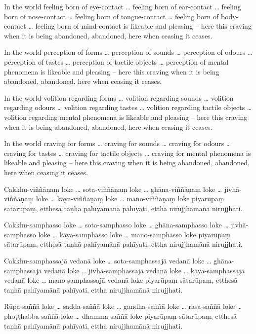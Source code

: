 In the world feeling born of eye-contact \ldots{} feeling born of ear-contact
\ldots{} feeling born of nose-contact \ldots{} feeling born of tongue-contact
\ldots{} feeling born of body-contact \ldots{} feeling born of mind-contact is
likeable and pleasing -- here this craving when it is being abandoned, abandoned,
here when ceasing it ceases.

In the world perception of forms \ldots{} perception of sounds \ldots{}
perception of odours \ldots{} perception of tastes \ldots{} perception of
tactile objects \ldots{} perception of mental phenomena is likeable and pleasing
-- here this craving when it is being abandoned, abandoned, here when ceasing it
ceases.

In the world volition regarding forms \ldots{} volition regarding sounds
\ldots{} volition regarding odours \ldots{} volition regarding tastes \ldots{}
volition regarding tactile objects \ldots{} volition regarding mental phenomena
is likeable and pleasing -- here this craving when it is being abandoned,
abandoned, here when ceasing it ceases.

In the world craving for forms \ldots{} craving for sounds \ldots{} craving for
odours \ldots{} craving for tastes \ldots{} craving for tactile objects \ldots{}
craving for mental phenomena is likeable and pleasing -- here this craving when
it is being abandoned, abandoned, here when ceasing it ceases.

\paliPage

Cakkhu-viññāṇaṃ loke \ldots{} sota-viññāṇaṃ loke \ldots{} ghāna-viññāṇaṃ loke
\ldots{} jivhā-viññāṇaṃ loke \ldots{} kāya-viññāṇaṃ loke \ldots{} mano-viññāṇaṃ
loke piyarūpaṃ sātarūpaṃ, etthesā taṇhā pahīyamānā pahīyati, ettha nirujjhamānā
nirujjhati.

Cakkhu-samphasso loke \ldots{} sota-samphasso loke \ldots{} ghāna-samphasso loke
\ldots{} jivhā-samphasso loke \ldots{} kāya-samphasso loke \ldots{} mano-samphasso
loke piyarūpaṃ sātarūpaṃ, etthesā taṇhā pahīyamānā pahīyati, ettha nirujjhamānā
nirujjhati.

Cakkhu-samphassajā vedanā loke \ldots{} sota-samphassajā vedanā loke \ldots{}
ghāna-samphassajā vedanā loke \ldots{} jivhā-samphassajā vedanā loke \ldots{}
kāya-samphassajā vedanā loke \ldots{} mano-samphassajā vedanā loke piyarūpaṃ
sātarūpaṃ, etthesā taṇhā pahīyamānā pahīyati, ettha nirujjhamānā nirujjhati.

Rūpa-saññā loke \ldots{} sadda-saññā loke \ldots{} gandha-saññā loke \ldots{}
rasa-saññā loke \ldots{} phoṭṭhabba-saññā loke \ldots{} dhamma-saññā loke piyarūpaṃ
sātarūpaṃ, etthesā taṇhā pahīyamānā pahīyati, ettha nirujjhamānā nirujjhati.

